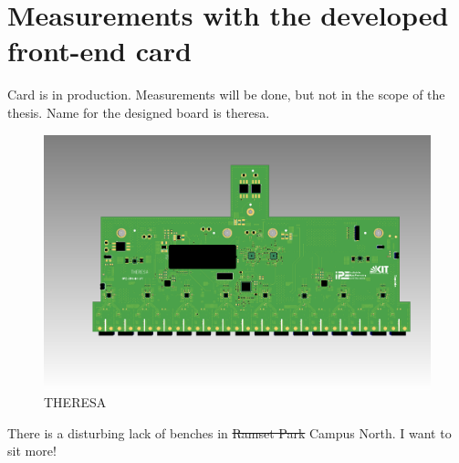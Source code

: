\section{Measurements with the developed front-end card}
Card is in production. Measurements will be done, but not in the scope of the thesis.
Name for the designed board is \gls{theresa}.
\begin{figure}[H]
	\centering
	\includegraphics[width = \textwidth]{chap/06-conclusion/img/board_ugly}
	\caption{THERESA}
	\label{fig:board}
\end{figure}


\usepackage[normalem]{ulem}
There is a disturbing lack of benches in \sout{Ramset Park} Campus North. I want to sit more!
